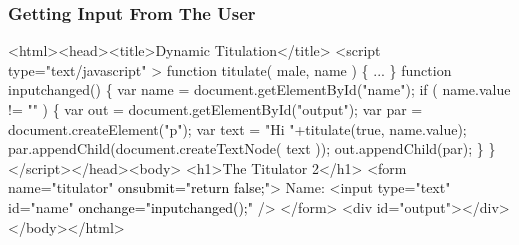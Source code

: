 \documentclass[dvipsnames,handout]{beamer}
\begin{document}
\begin{frame}[fragile]  
\frametitle{Getting Input From The User}
\begin{footnotesize}
\begin{semiverbatim}
<html><head><title>Dynamic Titulation</title>
<script type="text/javascript" >
function titulate( male, name ) \{ ... \}
{\color{black}function inputchanged() \{
  var name = document.getElementById("name");
  if ( name.value != "" ) \{   
    var out = document.getElementById("output");
    var par = document.createElement("p");
    var text = "Hi "+titulate(true, name.value);
    par.appendChild(document.createTextNode( text ));
    out.appendChild(par);
  \}
\}}
</script></head><body>
  <h1>The Titulator 2</h1>
  <form name="titulator" \textcolor{black}{onsubmit="return false;"}>
  Name: <input type="text" id="name" \textcolor{black}{onchange="inputchanged();"} /> 
</form> 
<div id="output"></div>
</body></html>
\end{semiverbatim}
\end{footnotesize}
\end{frame}
\end{document}
